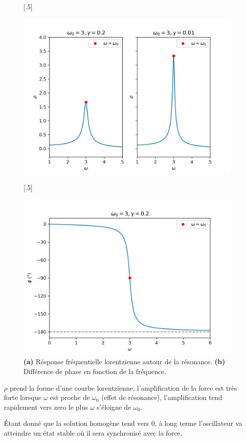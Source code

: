 \begin{figure}[!t]
    
    \subcaptionbox{}[.5\linewidth]{%
      \includegraphics[width=\linewidth]{images/harmonique/rho_plot_contrast.png}%
      
    }%
    \hfill
    \subcaptionbox{}[.5\linewidth]{%
      \includegraphics[width=\linewidth]{images/harmonique/frequency_phase_shift.png}%
      
    }
    \caption{\textbf{(a)} Résponse fréquentielle lorentzienne autour de la résonance. \textbf{(b)} Différence de phase en fonction de la fréquence.}
\end{figure}



$\rho$ prend la forme d’une courbe lorentzienne, l’amplification 
de la force est très forte lorsque $\omega$ est proche de $\omega_0$ 
(effet de résonance), l’amplification tend rapidement vers zero 
le plus $\omega$ s’éloigne de $\omega_0$.

Étant donné que la solution homogène tend vers $0$, à long terme l'oscillateur va atteindre un état stable où il sera synchronisé avec la force.

